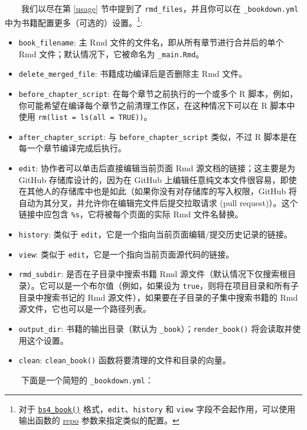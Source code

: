 \documentclass[
  12pt,
]{krantz}
\providecommand{\tightlist}{%
  \setlength{\itemsep}{0pt}\setlength{\parskip}{0pt}}
\theoremstyle{definition}
\theoremstyle{definition}
\theoremstyle{definition}
\theoremstyle{definition}
\theoremstyle{remark}
\begin{document}
  我们以尽在第 \ref{usage} 节中提到了 \texttt{rmd\_files}，并且你可以在 \texttt{\_bookdown.yml} 中为书籍配置更多（可选的）设置。\footnote{对于 \protect\hyperlink{bs4-book}{\texttt{bs4\_book()}} 格式，\texttt{edit}、\texttt{history} 和 \texttt{view} 字段不会起作用，可以使用输出函数的 \protect\hyperlink{specifying-the-repository}{repo} 参数来指定类似的配置。}:

\begin{itemize}
\tightlist
\item
  \texttt{book\_filename}: 主 Rmd 文件的文件名，即从所有章节进行合并后的单个 Rmd 文件；默认情况下，它被命名为 \texttt{\_main.Rmd}。
\item
  \texttt{delete\_merged\_file}: 书籍成功编译后是否删除主 Rmd 文件。
\item
  \texttt{before\_chapter\_script}: 在每个章节之前执行的一个或多个 R 脚本，例如，你可能希望在编译每个章节之前清理工作区，在这种情况下可以在 R 脚本中使用 \texttt{rm(list\ =\ ls(all\ =\ TRUE))}。
\item
  \texttt{after\_chapter\_script}: 与 \texttt{before\_chapter\_script} 类似，不过 R 脚本是在每一个章节编译完成后执行。
\item
  \texttt{edit}: 协作者可以单击后直接编辑当前页面 Rmd 源文档的链接；这主要是为 GitHub 存储库设计的，因为在 GitHub 上编辑任意纯文本文件很容易，即使在其他人的存储库中也是如此（如果你没有对存储库的写入权限，GitHub 将自动为其分叉，并允许你在编辑完文件后提交拉取请求 (pull request)）。这个链接中应包含 \texttt{\%s}，它将被每个页面的实际 Rmd 文件名替换。
\item
  \texttt{history}: 类似于 \texttt{edit}，它是一个指向当前页面编辑/提交历史记录的链接。
\item
  \texttt{view}: 类似于 \texttt{edit}，它是一个指向当前页面源代码的链接。
\item
  \texttt{rmd\_subdir}: 是否在子目录中搜索书籍 Rmd 源文件（默认情况下仅搜索根目录）。它可以是一个布尔值（例如，如果设为 \texttt{true}，则将在项目目录和所有子目录中搜索书记的 Rmd 源文件），如果要在子目录的子集中搜索书籍的 Rmd 源文件，它也可以是一个路径列表。
\item
  \texttt{output\_dir}: 书籍的输出目录（默认为 \texttt{\_book}）；\texttt{render\_book()} 将会读取并使用这个设置。
\item
  \texttt{clean}: \texttt{clean\_book()} 函数将要清理的文件和目录的向量。
\end{itemize}

  下面是一个简短的 \texttt{\_bookdown.yml}：
\end{document}

